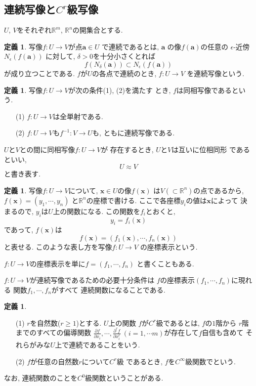 \documentclass[a4j,12pt]{jarticle}
\theoremstyle{definition}
\newtheorem{definition}[theorem]{定義}
\begin{document}
\subsection{連続写像と$C^r$級写像}
$U$, $V$をそれぞれ$\mathbb{R}^m$, 
$\mathbb{R}^n$の開集合とする. 
\begin{definition}\label{def:continuous map}
    写像$f:U\to V$が点$\boldsymbol{a}\in U$
    で連続であるとは, $\boldsymbol{a}$
    の像$f(\boldsymbol{a})$の任意の
    $\epsilon$-近傍$N_\epsilon(f(\boldsymbol{a}))$
    に対して, $\delta>0$を十分小さくとれば
    $$f(N_\delta(\boldsymbol{a}))\subset
    N_\epsilon(f(\boldsymbol{a}))$$
    が成り立つことである. 
    $f$が$U$の各点で連続のとき, $f:U\to V$
    を連続写像という. 
\end{definition}
\begin{definition}\label{def:homeomorphism}
    写像$f:U\to V$が次の条件(1), (2)を満たす
    とき, $f$は同相写像であるという. 
    \begin{itemize}
        \item[(1)]
        $f:U\to V$は全単射である. 
        \item[(2)]
        $f:U\to V$も$f^{-1}:V\to U$も, 
        ともに連続写像である. 
    \end{itemize}
    $U$と$V$との間に同相写像$f:U\to V$が
    存在するとき, $U$と$V$は互いに位相同形
    であるといい, 
    $$U \approx V$$
    と書き表す. 
\end{definition}
\begin{definition}\label{def:coordinate display}
    写像$f:U\to V$について, 
    $\boldsymbol{x}\in U$の像$f(\boldsymbol{x})$
    は$V(\subset \mathbb{R}^n)$の点であるから, 
    $f(\boldsymbol{x})=(y_1,\cdots ,y_n)$
    と$\mathbb{R}^n$の座標で書ける. 
    ここで各座標$y_i$の値は$\boldsymbol{x}$によって
    決まるので, $y_i$は$U$上の関数になる. 
    この関数を$f_i$とおくと, 
    $$y_i=f_i(\boldsymbol{x})$$
    であって, $f(\boldsymbol{x})$は
    $$f(\boldsymbol{x})=(f_1(\boldsymbol{x}),
    \cdots ,f_n(\boldsymbol{x}))$$
    と表せる. このような表し方を写像$f:U\to V$
    の座標表示という. 

    $f:U\to V$の座標表示を単に$f=(f_1,\cdots ,f_n)$
    と書くこともある. 
\end{definition}
$f:U\to V$が連続写像であるための必要十分条件は
$f$の座標表示$(f_1,\cdots ,f_n)$に現れる
関数$f_1,\cdots ,f_n$がすべて
連続関数になることである. 
\begin{definition}
    \begin{itemize}
        \item[(1)]
        $r$を自然数($r\geq 1$)とする. $U$上の関数
        $f$が$C^r$級であるとは, $f$の$1$階から
        $r$階までのすべての偏導関数
        $\frac{\partial f}{\partial x_i},\cdots ,
        \frac{\partial^rf}{\partial x_i^r}\ 
        (i=1,\cdots m)$が存在して$f$自信も含めて
        それらがみな$U$上で連続であることをいう. 
        \item[(2)]
        $f$が任意の自然数$r$について$C^r$級
        であるとき, $f$を$C^\infty$級関数でという. 
    \end{itemize}
    なお, 連続関数のことを$C^0$級関数ということがある. 
\end{definition}
\end{document}
